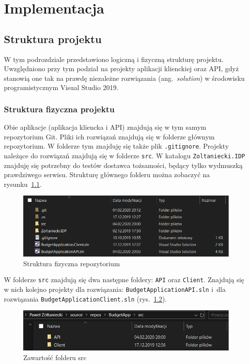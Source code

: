 \chapter{Implementacja}
\label{chap:implementacja}

\section{Struktura projektu}
\label{sec:struktura-projektu}
W tym podrozdziale przedstawiono logiczną i fizyczną strukturę projektu. Uwzględniono przy tym podział na projekty aplikacji klienckiej oraz API, gdyż stanowią one tak na prawdę niezależne rozwiązania (ang.~\emph{solution}) w środowisku programistycznym Visual Studio 2019.

\subsection{Struktura fizyczna projektu}
\label{sec:struktura-fizyczna-projektu}
Obie aplikacje (aplikacja kliencka i API) znajdują się w tym samym repozytorium Git. Pliki ich rozwiązań znajdują się w folderze głównym repozytorium. W folderze tym znajduję się także plik \texttt{.gitignore}. Projekty należące do rozwiązań znajdują się w folderze \texttt{src}. W katalogu \texttt{Zoltaniecki.IDP} znajduję się potrzebny do testów dostawca tożsamości, będący tylko wydmuszką prawdziwego serwisu. Strukturę głównego folderu można zobaczyć na rysunku~\ref{fig:fiz-1}.
\begin{figure}[ht]
	\centering
	\includegraphics[scale=.77]{rys04/struktura-fizyczna-1.PNG}
	\caption{Struktura fizyczna repozytorium}
	\label{fig:fiz-1}
\end{figure}

W folderze \texttt{src} znajdują się dwa następne foldery: \texttt{API} oraz \texttt{Client}. Znajdują się w nich kolejno projekty dla rozwiązania: \texttt{BudgetApplicationAPI.sln} i~dla rozwiązania \texttt{BudgetApplicationClient.sln} (rys.~\ref{fig:fiz-2}). 
\begin{figure}[ht]
	\centering
	\includegraphics[scale=.77]{rys04/struktura-fizyczna-2.PNG}
	\caption{Zawartość folderu src}
	\label{fig:fiz-2}
\end{figure}

